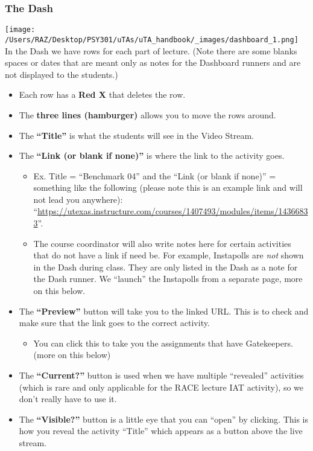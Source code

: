 \documentclass[
]{article}
\providecommand{\tightlist}{%
  \setlength{\itemsep}{0pt}\setlength{\parskip}{0pt}}
\begin{document}
\hypertarget{the-dash}{%
\subsubsection{The Dash}\label{the-dash}}

\texttt{[image: /Users/RAZ/Desktop/PSY301/uTAs/uTA\_handbook/\_images/dashboard\_1.png]} In the Dash we have rows for each part of lecture. (Note there are some blanks spaces or dates that are meant only as notes for the Dashboard runners and are not displayed to the students.)

\begin{itemize}
\tightlist
\item
  Each row has a \textbf{Red X} that deletes the row.
\item
  The \textbf{three lines (hamburger)} allows you to move the rows around.
\item
  The \textbf{``Title''} is what the students will see in the Video Stream.
\item
  The \textbf{``Link (or blank if none)''} is where the link to the activity goes.

  \begin{itemize}
  \tightlist
  \item
    Ex. Title = ``Benchmark 04'' and the ``Link (or blank if none)'' = something like the following (please note this is an example link and will not lead you anywhere): ``\url{https://utexas.instructure.com/courses/1407493/modules/items/14366833}''.
  \item
    The course coordinator will also write notes here for certain activities that do not have a link if need be. For example, Instapolls are \emph{not} shown in the Dash during class. They are only listed in the Dash as a note for the Dash runner. We ``launch'' the Instapolls from a separate page, more on this below.
  \end{itemize}
\item
  The \textbf{``Preview''} button will take you to the linked URL. This is to check and make sure that the link goes to the correct activity.

  \begin{itemize}
  \tightlist
  \item
    You can click this to take you the assignments that have Gatekeepers. (more on this below)
  \end{itemize}
\item
  The \textbf{``Current?''} button is used when we have multiple ``revealed'' activities (which is rare and only applicable for the RACE lecture IAT activity), so we don't really have to use it.
\item
  The \textbf{``Visible?''} button is a little eye that you can ``open'' by clicking. This is how you reveal the activity ``Title'' which appears as a button above the live stream.


\end{itemize}
\end{document}
